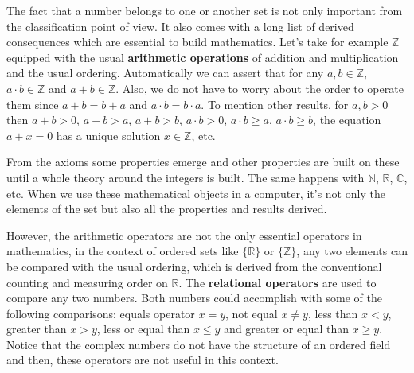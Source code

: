 The fact that a number belongs to one or another set is not only important from the classification point of view.
It also comes with a long list of derived consequences which are essential to build mathematics. 
Let's take for example $\mathbb{Z}$ equipped with the usual \textbf{arithmetic operations} of addition and multiplication and the usual ordering. 
Automatically we can assert that for any $a,b\in\mathbb{Z}$, $a\cdot b\in\mathbb{Z}$ and $a+b\in\mathbb{Z}$.
Also, we do not have to worry about the order to operate them since $a+b=b+a$ and $a\cdot b = b\cdot a$.
To mention other results, for $a,b>0$ then $a+b>0$, $a+b>a$, $a+b>b$, $a\cdot b>0$, $a\cdot b\geq a$, $a\cdot b\geq b$, the equation $a+x = 0$ has a unique solution $x\in\mathbb{Z}$, etc.

From the axioms some properties emerge and other properties are built on these until a whole theory around the integers is built.
The same happens with $\mathbb{N}$, $\mathbb{R}$, $\mathbb{C}$, etc. 
When we use these mathematical objects in a computer, 
it's not only the elements of the set but also
all the properties and results derived. 

However, the arithmetic operators are not the only essential operators in mathematics, 
in the context of ordered sets like $\{\mathbb{R}\}$ or $\{\mathbb{Z}\}$,
any two elements can be compared with the usual ordering, 
which is derived from the 
conventional counting and measuring order on $\mathbb{R}$. 
The \textbf{relational operators} are used to compare any two numbers. 
Both numbers could accomplish with some of the following comparisons: 
equals operator $x = y$, not equal $x\neq y$, less than $x < y$, greater than $x > y$, less or equal than $x \leq y$ and greater or equal than $x\geq y$. 
Notice that the complex numbers do not have the structure of an ordered field and then, these operators are not useful in this context. 


